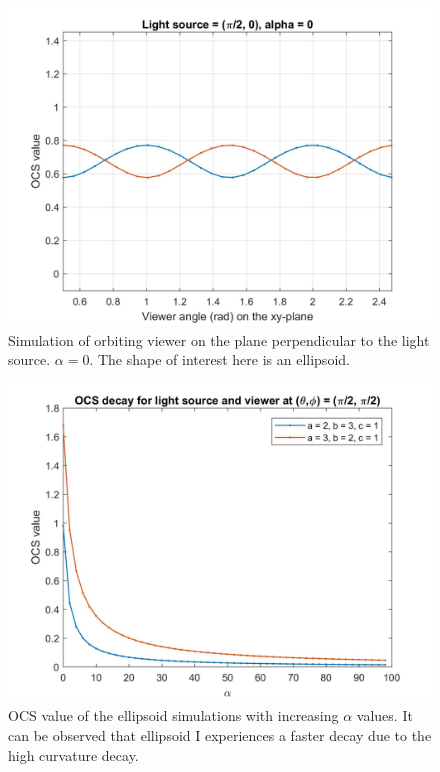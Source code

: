 \documentclass[11pt]{amsart}
\theoremstyle{definition}
\begin{document}
\begin{figure}[h]
\includegraphics[scale=0.2]{./figs/OCS_perpendicular_plane_ellipsoid}
\caption{Simulation of orbiting viewer on the plane perpendicular to the light source. $\alpha = 0$. The shape of interest here is an ellipsoid.}
\label{OCSPerpendicularPlaneEllipsoid}
\end{figure}

\begin{figure}[h]
\includegraphics[scale=0.2]{./figs/OCS_decay_by_alpha_ellipsoid}
\caption{OCS value of the ellipsoid simulations with increasing $\alpha$ values. It can be observed that ellipsoid I experiences a faster decay due to the high curvature decay.}
\label{OCSDecaybyAlphaEllipsoid}
\end{figure}
\end{document}
